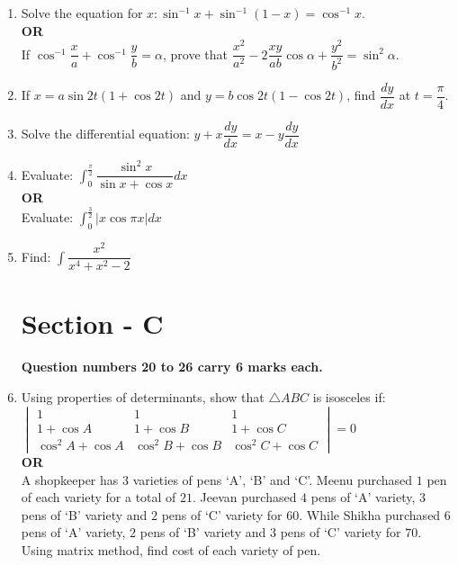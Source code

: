 \documentclass[12pt,-letter paper]{article}
\newcommand{\mydet}[1]{\ensuremath{\begin{vmatrix}#1\end{vmatrix}}}
\providecommand{\brak}[1]{\ensuremath{\left(#1\right)}}
\begin{document}
\begin{enumerate}
	\item Solve the equation for $x : \sin^{-1}{x} + \sin^{-1}{\brak{1-x}} = \cos^{-1}{x}$.\\
	\textbf{OR}\\
	If $ \cos^{-1}{\dfrac{x}{a}} + \cos^{-1}{\dfrac{y}{b}} = \alpha$, prove that $ \dfrac{x^2}{a^2} - 2\dfrac{xy}{ab}\cos{\alpha} + \dfrac{y^2}{b^2} = \sin^2{\alpha}$.\\
	
	\item If $x = a\sin{2t}\brak{1 + \cos{2t}}$ and $y = b\cos{2t}\brak{1 - \cos{2t}}$, find $ \dfrac{dy}{dx}$ at $t = \dfrac{\pi}{4}$.\\
	
	\item Solve the differential equation: $y + x\dfrac{dy}{dx} = x - y\dfrac{dy}{dx}$\\
	
	\item Evaluate: $ \int^{\frac{\pi}{2}}_0{\dfrac{\sin^2{x}}{\sin{x} + \cos{x}}dx}$\\
	\textbf{OR}\\
	Evaluate: $\int^{\frac{3}{2}}_0{|x\cos{\pi x}|dx}$\\
	
	\item Find: $\int{\dfrac{x^2}{x^4 + x^2 -2}}$\\
	
\section*{\textbf{Section - C}}
\textbf{Question numbers 20 to 26 carry 6 marks each.}\\

	\item Using properties of determinants, show that $\triangle{ABC}$ is isosceles if:\\
	$\mydet{1 & 1 & 1 \\ 1 + \cos{A} & 1 + \cos{B} & 1 + \cos{C} \\ \cos^2{A} + \cos{A} & \cos^2{B} + \cos{B} & \cos^2{C} + \cos{C} } = 0$\\
	\textbf{OR}\\
	A shopkeeper has $3$ varieties of pens `A', `B' and `C'. Meenu purchased $1$ pen of each variety for a total of \rupee$21$. Jeevan purchased $4$ pens of `A' variety, $3$ pens of `B' variety and $2$ pens of `C' variety for \rupee$60$. While Shikha purchased $6$ pens of `A' variety, $2$ pens of `B' variety and $3$ pens of `C' variety for \rupee$70$. Using matrix method, find cost of each variety of pen.\\
	

\end{enumerate}
\end{document}
